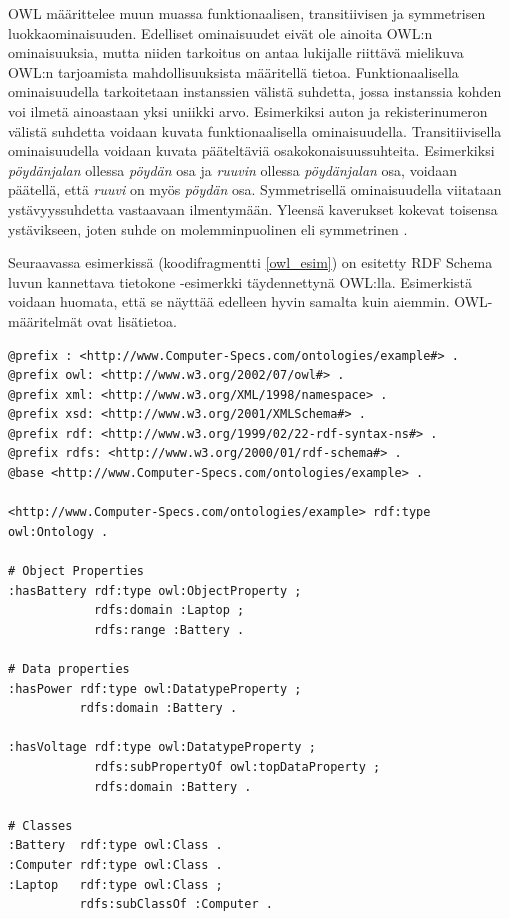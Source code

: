 \documentclass[finnish, 12pt, a4paper, elec, utf8, pdfa, online]{aaltothesis}
\begin{document}
{OWL määrittelee muun muassa funktionaalisen, transitiivisen ja symmetrisen luokkaominaisuuden. Edelliset ominaisuudet eivät ole ainoita OWL:n ominaisuuksia, mutta niiden tarkoitus on antaa lukijalle riittävä mielikuva OWL:n tarjoamista mahdollisuuksista määritellä tietoa. Funktionaalisella ominaisuudella tarkoitetaan instanssien välistä suhdetta, jossa instanssia kohden voi ilmetä ainoastaan yksi uniikki arvo. Esimerkiksi auton ja rekisterinumeron välistä suhdetta voidaan kuvata funktionaalisella ominaisuudella. Transitiivisella ominaisuudella voidaan kuvata pääteltäviä osakokonaisuussuhteita. Esimerkiksi \textit{pöydänjalan} ollessa \textit{pöydän} osa ja \textit{ruuvin} ollessa \textit{pöydänjalan} osa, voidaan päätellä, että \textit{ruuvi} on myös \textit{pöydän} osa. Symmetrisellä ominaisuudella viitataan ystävyyssuhdetta vastaavaan ilmentymään. Yleensä kaverukset kokevat toisensa ystävikseen, joten suhde on molemminpuolinen eli symmetrinen \cite{OWL_specification}.

Seuraavassa esimerkissä (koodifragmentti \ref{owl_esim}) on esitetty RDF Schema luvun kannettava tietokone -esimerkki täydennettynä OWL:lla. Esimerkistä voidaan huomata, että se näyttää edelleen hyvin samalta kuin aiemmin. OWL-määritelmät ovat lisätietoa.
\enlargethispage{-2\baselineskip}

\begin{lstlisting}[style=codeblock,caption={OWL esimerkki.},captionpos=b,label={owl_esim}]
@prefix : <http://www.Computer-Specs.com/ontologies/example#> .
@prefix owl: <http://www.w3.org/2002/07/owl#> .
@prefix xml: <http://www.w3.org/XML/1998/namespace> .
@prefix xsd: <http://www.w3.org/2001/XMLSchema#> .
@prefix rdf: <http://www.w3.org/1999/02/22-rdf-syntax-ns#> .
@prefix rdfs: <http://www.w3.org/2000/01/rdf-schema#> .
@base <http://www.Computer-Specs.com/ontologies/example> .

<http://www.Computer-Specs.com/ontologies/example> rdf:type owl:Ontology .

# Object Properties
:hasBattery rdf:type owl:ObjectProperty ;
            rdfs:domain :Laptop ;
            rdfs:range :Battery .

# Data properties
:hasPower rdf:type owl:DatatypeProperty ;
          rdfs:domain :Battery .

:hasVoltage rdf:type owl:DatatypeProperty ;
            rdfs:subPropertyOf owl:topDataProperty ;
            rdfs:domain :Battery .

# Classes
:Battery  rdf:type owl:Class .
:Computer rdf:type owl:Class .
:Laptop   rdf:type owl:Class ;
          rdfs:subClassOf :Computer .


\end{lstlisting}}
\end{document}
